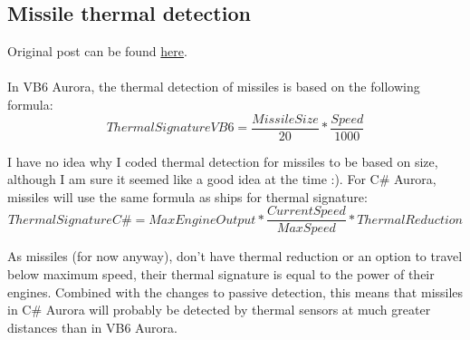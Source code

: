 \documentclass[../../Aurora C# unofficial manual.tex]{subfiles}
\begin{document}
	\subsection{Missile thermal detection}
	Original post can be found
	\href{http://aurora2.pentarch.org/index.php?topic=8495.msg103478#msg103478}{here}.
	\\\\
	
	In VB6 Aurora, the thermal detection of missiles is based on the following formula:
	\[ Thermal Signature VB6 = \frac{Missile Size}{20} * \frac{Speed}{1000} \]
	
	I have no idea why I coded thermal detection for missiles to be based on size, although I am sure it seemed like a good idea at the time :). For C\# Aurora, missiles will use the same formula as ships for thermal signature:
	\[ Thermal Signature C\# = Max Engine Output * \frac{Current Speed}{Max Speed} * Thermal Reduction \]
	
	As missiles (for now anyway), don't have thermal reduction or an option to travel below maximum speed, their thermal signature is equal to the power of their engines. Combined with the changes to passive detection, this means that missiles in C\# Aurora will probably be detected by thermal sensors at much greater distances than in VB6 Aurora.
\end{document}
